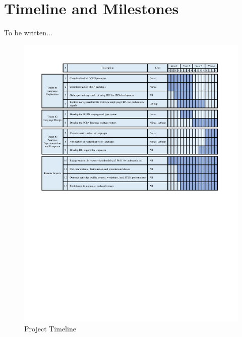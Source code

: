 
\section{Timeline and Milestones}
\label{sec:timeline}

To be written...


\begin{figure}[h!]
     \centering
     \includegraphics[width=6.4in]{TimeLine.pdf}
     \caption{Project Timeline}
 \end{figure}


